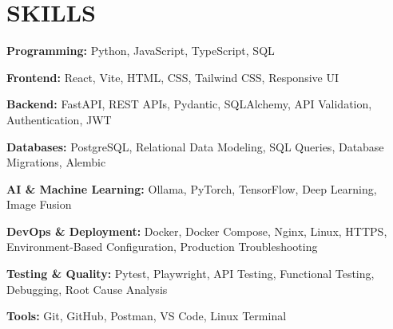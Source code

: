 \section*{SKILLS}

\textbf{Programming:} Python, JavaScript, TypeScript, SQL

\textbf{Frontend:} React, Vite, HTML, CSS, Tailwind CSS, Responsive UI

\textbf{Backend:} FastAPI, REST APIs, Pydantic, SQLAlchemy, API Validation, Authentication, JWT

\textbf{Databases:} PostgreSQL, Relational Data Modeling, SQL Queries, Database Migrations, Alembic

\textbf{AI \& Machine Learning:} Ollama, PyTorch, TensorFlow, Deep Learning, Image Fusion

\textbf{DevOps \& Deployment:} Docker, Docker Compose, Nginx, Linux, HTTPS, Environment-Based Configuration, Production Troubleshooting

\textbf{Testing \& Quality:} Pytest, Playwright, API Testing, Functional Testing, Debugging, Root Cause Analysis

\textbf{Tools:} Git, GitHub, Postman, VS Code, Linux Terminal
